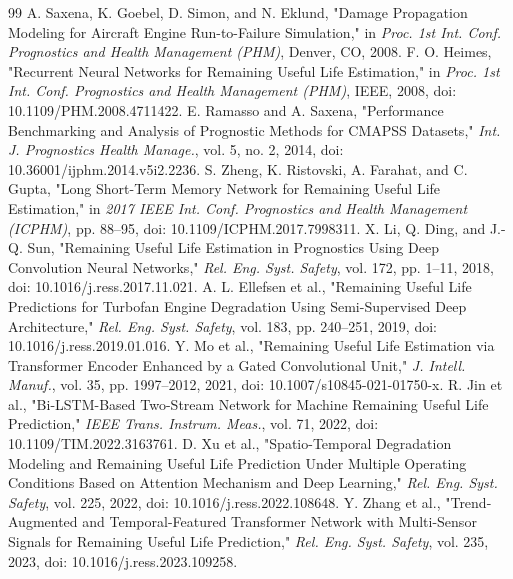 \documentclass[preprint,10pt]{elsarticle}
\begin{document}

\begin{thebibliography}{99}
  A. Saxena, K. Goebel, D. Simon, and N. Eklund, "Damage Propagation Modeling for Aircraft Engine Run-to-Failure Simulation," in \textit{Proc. 1st Int. Conf. Prognostics and Health Management (PHM)}, Denver, CO, 2008.
  F. O. Heimes, "Recurrent Neural Networks for Remaining Useful Life Estimation," in \textit{Proc. 1st Int. Conf. Prognostics and Health Management (PHM)}, IEEE, 2008, doi: 10.1109/PHM.2008.4711422.
  E. Ramasso and A. Saxena, "Performance Benchmarking and Analysis of Prognostic Methods for CMAPSS Datasets," \textit{Int. J. Prognostics Health Manage.}, vol. 5, no. 2, 2014, doi: 10.36001/ijphm.2014.v5i2.2236.
  S. Zheng, K. Ristovski, A. Farahat, and C. Gupta, "Long Short-Term Memory Network for Remaining Useful Life Estimation," in \textit{2017 IEEE Int. Conf. Prognostics and Health Management (ICPHM)}, pp. 88–95, doi: 10.1109/ICPHM.2017.7998311.
  X. Li, Q. Ding, and J.-Q. Sun, "Remaining Useful Life Estimation in Prognostics Using Deep Convolution Neural Networks," \textit{Rel. Eng. Syst. Safety}, vol. 172, pp. 1–11, 2018, doi: 10.1016/j.ress.2017.11.021.
  A. L. Ellefsen et al., "Remaining Useful Life Predictions for Turbofan Engine Degradation Using Semi-Supervised Deep Architecture," \textit{Rel. Eng. Syst. Safety}, vol. 183, pp. 240–251, 2019, doi: 10.1016/j.ress.2019.01.016.
  Y. Mo et al., "Remaining Useful Life Estimation via Transformer Encoder Enhanced by a Gated Convolutional Unit," \textit{J. Intell. Manuf.}, vol. 35, pp. 1997–2012, 2021, doi: 10.1007/s10845-021-01750-x.
  R. Jin et al., "Bi-LSTM-Based Two-Stream Network for Machine Remaining Useful Life Prediction," \textit{IEEE Trans. Instrum. Meas.}, vol. 71, 2022, doi: 10.1109/TIM.2022.3163761.
  D. Xu et al., "Spatio-Temporal Degradation Modeling and Remaining Useful Life Prediction Under Multiple Operating Conditions Based on Attention Mechanism and Deep Learning," \textit{Rel. Eng. Syst. Safety}, vol. 225, 2022, doi: 10.1016/j.ress.2022.108648.
  Y. Zhang et al., "Trend-Augmented and Temporal-Featured Transformer Network with Multi-Sensor Signals for Remaining Useful Life Prediction," \textit{Rel. Eng. Syst. Safety}, vol. 235, 2023, doi: 10.1016/j.ress.2023.109258.

\end{thebibliography}
\end{document}
